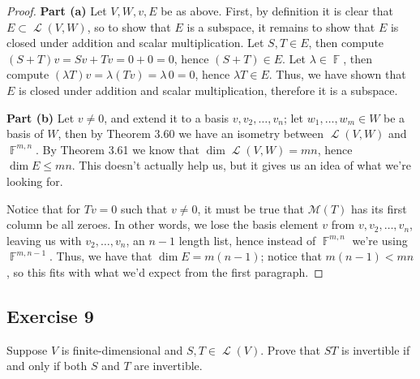 \documentclass[letterpaper, 12pt]{amsart}
\DeclareMathOperator{\F}{\mathbb{F}}				%
\DeclareMathOperator{\Ell}{\mathscr{L}}				%
\theoremstyle{definition}  							%
\begin{document}
		\begin{proof}
			\textbf{Part (a)}
			Let $V,W,v,E$ be as above.
			First, by definition it is clear that $E \subset \Ell(V,W)$, so to show that $E$ is a subspace, it remains to show that $E$ is closed under addition and scalar multiplication.
			Let $S,T \in E$, then compute $(S+T)v = Sv + Tv = 0 + 0 = 0$, hence $(S+T) \in E$.
			Let $\lambda \in \F$, then compute $(\lambda T)v = \lambda (Tv) = \lambda \, 0 = 0$, hence $\lambda T \in E$.
			Thus, we have shown that $E$ is closed under addition and scalar multiplication, therefore it is a subspace.
			
			\textbf{Part (b)}
			Let $v \neq 0$, and extend it to a basis $v, v_{2}, \dots, v_{n}$; let $w_{1}, \dots, w_{m} \in W$ be a basis of $W$, then by Theorem 3.60 we have an isometry between $\Ell(V,W)$ and $\F^{m,n}$. 
			By Theorem 3.61 we know that $\dim{\Ell(V,W)} = mn$, hence $\dim{E} \leq mn$.
			This doesn't actually help us, but it gives us an idea of what we're looking for.

			Notice that for $Tv = 0$ such that $v \neq 0$, it must be true that $\mathcal{M}(T)$ has its first column be all zeroes.
			In other words, we lose the basis element $v$ from $v, v_{2}, \dots, v_{n}$, leaving us with $v_{2}, \dots, v_{n}$, an $n-1$ length list, hence instead of $\F^{m,n}$ we're using $\F^{m,n-1}$.
			Thus, we have that $\dim E = m(n-1)$; notice that $m(n-1) < mn$, so this fits with what we'd expect from the first paragraph.
		\end{proof}

		\subsection*{Exercise 9}
		Suppose $V$ is finite-dimensional and $S,T \in \Ell(V)$. 
		Prove that $ST$ is invertible if and only if both $S$ and $T$ are invertible.
		
\end{document}
